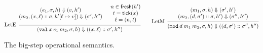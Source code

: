 \documentclass{article}
\theoremstyle{definition}
\newcommand*{\cons}{::}
\newcommand*{\modid}{d}
\newcommand*{\ctx}{\sigma}
\newcommand*{\mem}{h}
\newcommand*{\tick}{\mathsf{tick}}
\newcommand*{\fresh}{\mathsf{fresh}}
\newcommand*{\Lete}{\mathtt{val}}
\newcommand*{\Letm}{\mathtt{mod}}
\begin{document}
\begin{figure}[h!]
  \[
    \begin{prooftree}
      \hypo{
        \begin{matrix}
          (e_{1}, \ctx, \mem)
          \Downarrow
          (v, \mem') \\
          (m_{2}, (x, \ell)\cons \ctx, \mem'[\ell\mapsto v])
          \Downarrow
          (\ctx', \mem'')
        \end{matrix}
      }
      \hypo{
        \begin{matrix}
          n\in\fresh(\mem') \\
          t=\tick(x)        \\
          \ell=(n,t)
        \end{matrix}
      }
      \infer[left label=LetE]2{
      (\Lete\:x\:e_1\:m_2, \ctx, \mem)
      \Downarrow
      ((x,\ell)\cons\ctx', \mem'')
      }
    \end{prooftree}\qquad
    \begin{prooftree}
      \hypo{
        \begin{matrix}
          (m_{1}, \ctx, \mem)
          \Downarrow
          (\ctx', \mem') \\
          (m_{2}, (\modid, \ctx')\cons \ctx, \mem')
          \Downarrow
          (\ctx'', \mem'')
        \end{matrix}
      }
      \infer[left label=LetM]1{
      (\Letm\:\modid\:m_{1}\:m_{2}, \ctx, \mem)
      \Downarrow
      ((\modid,\ctx')\cons\ctx'', \mem'')
      }
    \end{prooftree}
  \]
  \caption{The big-step operational semantics.}
  \label{fig:simpeval}
\end{figure}
\end{document}
